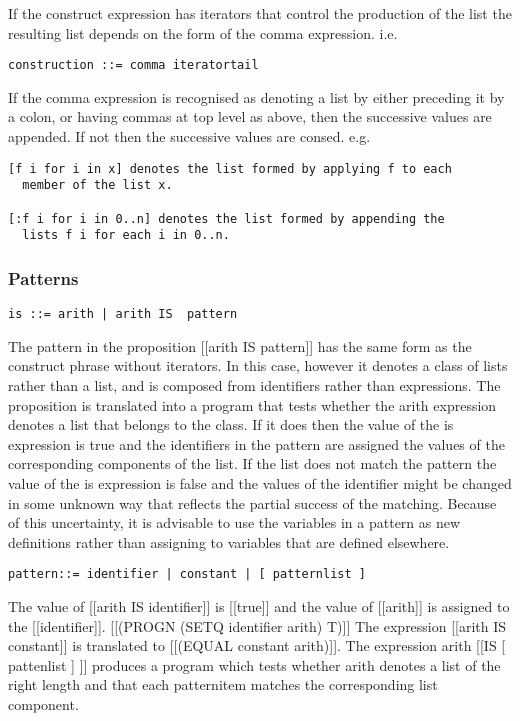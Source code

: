 \documentclass{article}
\begin{document}
If the construct expression has iterators that control the production
of the list the resulting list depends on the form of the comma
expression.
i.e.
\begin{verbatim}
construction ::= comma iteratortail
\end{verbatim}

If the comma expression is recognised as denoting a list
by either preceding it by a colon, or having commas at top level
as above, then the successive values are appended.  If not then
the successive values are consed.
e.g.
\begin{verbatim}
[f i for i in x] denotes the list formed by applying f to each
  member of the list x.

[:f i for i in 0..n] denotes the list formed by appending the
  lists f i for each i in 0..n.
\end{verbatim}

\subsubsection{Patterns}
\label{sec:boot:pattern}

\begin{verbatim}
is ::= arith | arith IS  pattern
\end{verbatim}

The pattern in the proposition [[arith IS pattern]] has the same form
as the construct phrase without iterators. In this case, however it
denotes a class of lists rather than a list, and is composed
from identifiers rather than expressions.  The proposition
is translated into a program that tests whether the arith expression
denotes a list that belongs to the class. If it does then the value
of the is expression is true and the identifiers in
the pattern are assigned the values of the corresponding
components of the list. If the list does not match the pattern
the value of the is expression is false and the values of the
identifier might be changed in some unknown way that reflects the
partial success of the matching.
Because of this uncertainty,
it is advisable to use the variables in a pattern
as new definitions rather than assigning to variables that are
defined elsewhere.
\begin{verbatim}
pattern::= identifier | constant | [ patternlist ]
\end{verbatim}

The value of [[arith IS identifier]] is [[true]] and the value of
[[arith]] is assigned to the [[identifier]].
[[(PROGN (SETQ identifier arith) T)]]
The expression [[arith IS constant]] is translated to
[[(EQUAL constant arith)]].
The expression arith [[IS [ pattenlist ] ]]
produces a program which tests whether arith denotes a list
of the right length and that each patternitem matches the corresponding
list component.
\end{document}
